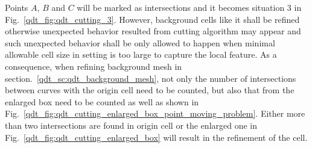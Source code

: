 Points $A$, $B$ and $C$ will be marked as intersections and it becomes situation 3 in Fig.~\ref{qdt_fig:qdt_cutting_3}.
However, background cells like it shall be refined otherwise unexpected behavior resulted from cutting algorithm may appear and such unexpected behavior shall be only allowed to happen when minimal allowable cell size in setting is too large to capture the local feature.
As a consequence, when refining background mesh in section.~\ref{qdt_sc:qdt_background_mesh}, not only the number of intersections between curves with the origin cell need to be counted, but also that from the enlarged box need to be counted as well as shown in Fig.~\ref{qdt_fig:qdt_cutting_enlarged_box_point_moving_problem}.
Either more than two intersections are found in origin cell or the enlarged one in Fig.~\ref{qdt_fig:qdt_cutting_enlarged_box} will result in the refinement of the cell.
